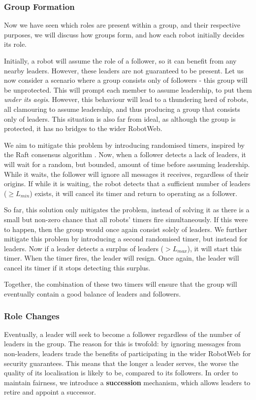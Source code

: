 \subsubsection{Group Formation} \label{section:group-formation}
Now we have seen which roles are present within a group, and their respective purposes, we will discuss how groups form, and how each robot initially decides its role.

Initially, a robot will assume the role of a follower, so it can benefit from any nearby leaders. However, these leaders are not guaranteed to be present. Let us now consider a scenario where a group consists only of followers - this group will be unprotected. This will prompt each member to assume leadership, to put them \textit{under its aegis}. However, this behaviour will lead to a thundering herd of robots, all clamouring to assume leadership, and thus producing a group that consists only of leaders. This situation is also far from ideal, as although the group is protected, it has no bridges to the wider RobotWeb.

We aim to mitigate this problem by introducing randomised timers, inspired by the Raft consensus algorithm \cite{raft}. Now, when a follower detects a lack of leaders, it will wait for a random, but bounded, amount of time before assuming leadership. While it waits, the follower will ignore all messages it receives, regardless of their origins. If while it is waiting, the robot detects that a sufficient number of leaders ($\geq L_{min}$) exists, it will cancel its timer and return to operating as a follower.

So far, this solution only mitigates the problem, instead of solving it as there is a small but non-zero chance that all robots' timers fire simultaneously. If this were to happen, then the group would once again consist solely of leaders. We further mitigate this problem by introducing a second randomised timer, but instead for leaders. Now if a leader detects a surplus of leaders ($> L_{max}$), it will start this timer. When the timer fires, the leader will resign. Once again, the leader will cancel its timer if it stops detecting this surplus.

Together, the combination of these two timers will ensure that the group will eventually contain a good balance of leaders and followers.

\subsubsection{Role Changes}
Eventually, a leader will seek to become a follower regardless of the number of leaders in the group. The reason for this is twofold: by ignoring messages from non-leaders, leaders trade the benefits of participating in the wider RobotWeb for security guarantees. This means that the longer a leader serves, the worse the quality of its localisation is likely to be, compared to its followers. In order to maintain fairness, we introduce a \textbf{succession} mechanism, which allows leaders to retire and appoint a successor.

